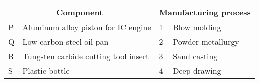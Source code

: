 \begin{center}
\begin{tabular}{|p{1cm}|p{5cm}|p{1cm}|p{4cm}|}
\hline
\multicolumn{2}{|c|}{Component} & \multicolumn{2}{c|}{Manufacturing process} \\
\hline
P & Aluminum alloy piston for IC engine & 1 & Blow molding \\
\hline
Q & Low carbon steel oil pan & 2 & Powder metallurgy \\
\hline
R & Tungsten carbide cutting tool insert & 3 & Sand casting \\
\hline
S & Plastic bottle & 4 & Deep drawing \\
\hline
\end{tabular}
\end{center}